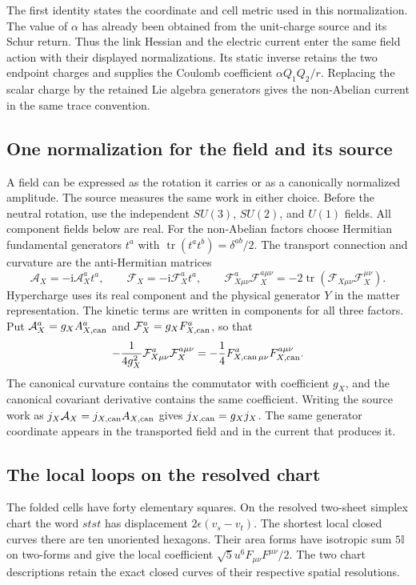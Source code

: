 \documentclass[aps,prx,onecolumn,10pt,notitlepage,nofootinbib,longbibliography]{revtex4-2}
\numberwithin{equation}{section}
\numberwithin{table}{section}
\newcommand{\Id}{\mathbb I}
\newcommand{\tr}{\operatorname{tr}}
\newcommand{\ii}{\mathrm i}
\begin{document}
The first identity states the coordinate and cell metric used in this normalization. The value of \(\alpha\) has already been obtained from the unit-charge source and its Schur return. Thus the link Hessian and the electric current enter the same field action with their displayed normalizations. Its static inverse retains the two endpoint charges and supplies the Coulomb coefficient \(\alpha Q_1Q_2/r\). Replacing the scalar charge by the retained Lie algebra generators gives the non-Abelian current in the same trace convention.

\subsection{One normalization for the field and its source}
A field can be expressed as the rotation it carries or as a canonically normalized amplitude. The source measures the same work in either choice. Before the neutral rotation, use the independent $SU(3)$, $SU(2)$, and $U(1)$ fields. All component fields below are real. For the non-Abelian factors choose Hermitian fundamental generators $t^a$ with $\tr(t^at^b)=\delta^{ab}/2$. The transport connection and curvature are the anti-Hermitian matrices
\begin{equation}
 \mathcal A_X=-\ii\mathcal A_X^at^a,\qquad
 \mathcal F_X=-\ii\mathcal F_X^at^a,\qquad
 \mathcal F_{X\mu\nu}^a\mathcal F_X^{a\mu\nu}
 =-2\tr(\mathcal F_{X\mu\nu}\mathcal F_X^{\mu\nu}).
 \label{eq:gaugecomponents}
\end{equation}
Hypercharge uses its real component and the physical generator $Y$ in the matter representation. The kinetic terms are written in components for all three factors. Put $\mathcal A_X^a=g_XA_{X,{\rm can}}^a$ and $\mathcal F_X^a=g_XF_{X,{\rm can}}^a$, so that
\begin{equation}
 -\frac1{4g_X^2}\mathcal F_{X\mu\nu}^a\mathcal F_X^{a\mu\nu}
 =-\frac14F_{X,{\rm can}\,\mu\nu}^aF_{X,{\rm can}}^{a\mu\nu}.
 \label{eq:canonicalgauge}
\end{equation}
The canonical curvature contains the commutator with coefficient $g_X$, and the canonical covariant derivative contains the same coefficient. Writing the source work as $j_X\mathcal A_X=j_{X,{\rm can}}A_{X,{\rm can}}$ gives $j_{X,{\rm can}}=g_Xj_X$. The same generator coordinate appears in the transported field and in the current that produces it.

\subsection{The local loops on the resolved chart}
The folded cells have forty elementary squares. On the resolved two-sheet
simplex chart the word $stst$ has displacement $2\epsilon(v_s-v_t)$.
The shortest local closed curves there are ten unoriented hexagons. Their
area forms have isotropic sum $5\Id$ on two-forms and give the local
coefficient $\sqrt5u^6F_{\mu\nu}F^{\mu\nu}/2$. The two chart descriptions
retain the exact closed curves of their respective spatial resolutions.
\end{document}
